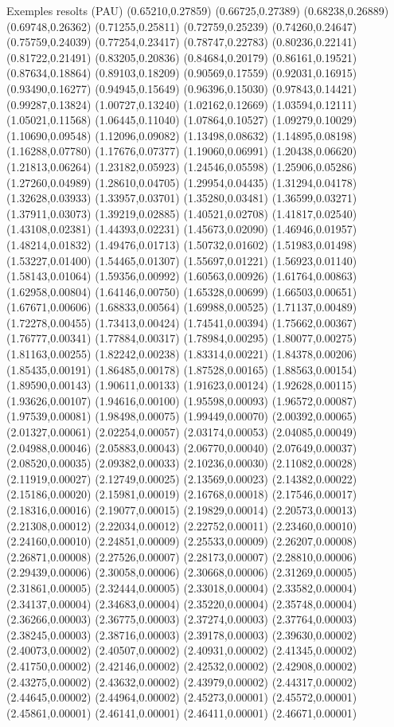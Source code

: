 \documentclass[11pt,a4paper]{article}
\begin{document}
\begin{fmex}{Exemples resolts (PAU)}
(0.65210,0.27859) (0.66725,0.27389) (0.68238,0.26889) (0.69748,0.26362) (0.71255,0.25811) (0.72759,0.25239) (0.74260,0.24647) (0.75759,0.24039) (0.77254,0.23417) (0.78747,0.22783) (0.80236,0.22141) (0.81722,0.21491) (0.83205,0.20836) (0.84684,0.20179) (0.86161,0.19521) (0.87634,0.18864) (0.89103,0.18209) (0.90569,0.17559) (0.92031,0.16915) (0.93490,0.16277) (0.94945,0.15649) (0.96396,0.15030) (0.97843,0.14421) (0.99287,0.13824) (1.00727,0.13240) (1.02162,0.12669) (1.03594,0.12111) (1.05021,0.11568) (1.06445,0.11040) (1.07864,0.10527) (1.09279,0.10029) (1.10690,0.09548) (1.12096,0.09082) (1.13498,0.08632) (1.14895,0.08198) (1.16288,0.07780) (1.17676,0.07377) (1.19060,0.06991) (1.20438,0.06620) (1.21813,0.06264) (1.23182,0.05923) (1.24546,0.05598) (1.25906,0.05286) (1.27260,0.04989) (1.28610,0.04705) (1.29954,0.04435) (1.31294,0.04178) (1.32628,0.03933) (1.33957,0.03701) (1.35280,0.03481) (1.36599,0.03271) (1.37911,0.03073) (1.39219,0.02885) (1.40521,0.02708) (1.41817,0.02540) (1.43108,0.02381) (1.44393,0.02231) (1.45673,0.02090) (1.46946,0.01957) (1.48214,0.01832) (1.49476,0.01713) (1.50732,0.01602) (1.51983,0.01498) (1.53227,0.01400) (1.54465,0.01307) (1.55697,0.01221) (1.56923,0.01140) (1.58143,0.01064) (1.59356,0.00992) (1.60563,0.00926) (1.61764,0.00863) (1.62958,0.00804) (1.64146,0.00750) (1.65328,0.00699) (1.66503,0.00651) (1.67671,0.00606) (1.68833,0.00564) (1.69988,0.00525) (1.71137,0.00489) (1.72278,0.00455) (1.73413,0.00424) (1.74541,0.00394) (1.75662,0.00367) (1.76777,0.00341) (1.77884,0.00317) (1.78984,0.00295) (1.80077,0.00275) (1.81163,0.00255) (1.82242,0.00238) (1.83314,0.00221) (1.84378,0.00206) (1.85435,0.00191) (1.86485,0.00178) (1.87528,0.00165) (1.88563,0.00154) (1.89590,0.00143) (1.90611,0.00133) (1.91623,0.00124) (1.92628,0.00115) (1.93626,0.00107) (1.94616,0.00100) (1.95598,0.00093) (1.96572,0.00087) (1.97539,0.00081) (1.98498,0.00075) (1.99449,0.00070) (2.00392,0.00065) (2.01327,0.00061) (2.02254,0.00057) (2.03174,0.00053) (2.04085,0.00049) (2.04988,0.00046) (2.05883,0.00043) (2.06770,0.00040) (2.07649,0.00037) (2.08520,0.00035) (2.09382,0.00033) (2.10236,0.00030) (2.11082,0.00028) (2.11919,0.00027) (2.12749,0.00025) (2.13569,0.00023) (2.14382,0.00022) (2.15186,0.00020) (2.15981,0.00019) (2.16768,0.00018) (2.17546,0.00017) (2.18316,0.00016) (2.19077,0.00015) (2.19829,0.00014) (2.20573,0.00013) (2.21308,0.00012) (2.22034,0.00012) (2.22752,0.00011) (2.23460,0.00010) (2.24160,0.00010) (2.24851,0.00009) (2.25533,0.00009) (2.26207,0.00008) (2.26871,0.00008) (2.27526,0.00007) (2.28173,0.00007) (2.28810,0.00006) (2.29439,0.00006) (2.30058,0.00006) (2.30668,0.00006) (2.31269,0.00005) (2.31861,0.00005) (2.32444,0.00005) (2.33018,0.00004) (2.33582,0.00004) (2.34137,0.00004) (2.34683,0.00004) (2.35220,0.00004) (2.35748,0.00004) (2.36266,0.00003) (2.36775,0.00003) (2.37274,0.00003) (2.37764,0.00003) (2.38245,0.00003) (2.38716,0.00003) (2.39178,0.00003) (2.39630,0.00002) (2.40073,0.00002) (2.40507,0.00002) (2.40931,0.00002) (2.41345,0.00002) (2.41750,0.00002) (2.42146,0.00002) (2.42532,0.00002) (2.42908,0.00002) (2.43275,0.00002) (2.43632,0.00002) (2.43979,0.00002) (2.44317,0.00002) (2.44645,0.00002) (2.44964,0.00002) (2.45273,0.00001) (2.45572,0.00001) (2.45861,0.00001) (2.46141,0.00001) (2.46411,0.00001) (2.46671,0.00001) 
\end{fmex}
\end{document}
